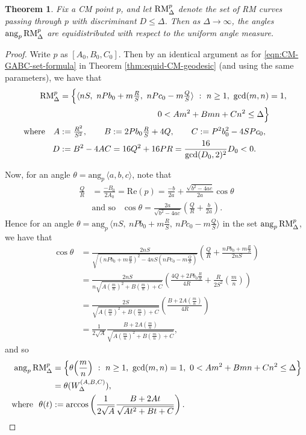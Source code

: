 \documentclass[11pt,letterpaper,reqno]{amsart}
\newtheorem{theorem}{Theorem}[section]
\numberwithin{equation}{section}
\numberwithin{figure}{section}
\numberwithin{table}{section}
\newcommand{\lrp}[1]{\left(#1\right)}
\newcommand{\RM}{\textnormal{RM}}
\begin{document}
{
\renewcommand{\thetheorem}{\ref{thm:equid-RM-fixedpt}}
\begin{theorem} 
    Fix a CM point $p$, and let 
    $\RM^p_{\Delta}$ denote the set of RM curves passing through $p$ with discriminant $D \le \Delta$. 
    Then as $\Delta \to \infty$, the angles $\mathrm{ang}_p\, \RM^p_{\Delta}$ are equidistributed with respect to the uniform angle measure.
\end{theorem}
\addtocounter{theorem}{-1}
}
\begin{proof}  
Write $p$ as $[A_0,B_0,C_0]$. Then by an identical argument as for \eqref{eqn:CM-GABC-set-formula} in Theorem \ref{thm:equid-CM-geodesic} (and using the same parameters), we have that
\begin{align}
    \RM^{p}_{\Delta} 
    &= \Big\{\langle{nS,~nPb_0+m\tfrac{R}{S},~nPc_0-m\tfrac{Q}{S}}\rangle  ~:~ n\ge 1,~ \gcd(m,n)=1,~ \\
    &\hspace{41mm} 0 < A m^2 + B mn + C n^2  \le \Delta
    \Big\} \\
    \text{where}\quad  A&:=\tfrac{R^2}{S^2}, \qquad B := 2Pb_0 \tfrac{R}{S}+4Q, \qquad C := P^2b_0^2-4SPc_0,  \\
     D &:= B^2-4AC = 16Q^2+16PR = \frac{16}{\gcd(D_0,2)^2} D_0 < 0.
\end{align}

Now, for an angle $\theta = \mathrm{ang}_p\, \langle a,b,c \rangle$, note that
\begin{align}
    \frac{Q}{R} &= \frac{-B_0}{2A_0} = \mathrm{Re}(p) = \frac{-b}{2a} + \frac{\sqrt{b^2-4ac}}{2a} \cos \theta \\
    &\text{and so }\ \ \cos \theta = \frac{2a}{\sqrt{b^2-4ac}}\lrp{\frac{Q}{R} + \frac{b}{2a}}.
\end{align}
Hence for an angle $\theta=\mathrm{ang}_p\, \langle{nS,~nPb_0+m\frac{R}{S},~nPc_0-m\frac{Q}{S}}\rangle$ in the set $\mathrm{ang}_p\, \RM^{p}_{\Delta}$, we have that
\begin{align}
    \cos \theta 
    &= \frac{2nS}{\sqrt{(nPb_0+m\frac{R}{S})^2-4nS(nPc_0-m\frac{Q}{S})}}\lrp{\frac{Q}{R} + \frac{nPb_0+m\frac{R}{S}}{2nS}} \\
    &= \frac{2nS}{n\sqrt{A \lrp{\frac mn}^2 + B \lrp{\frac mn} + C}}\lrp{\frac{4Q+2Pb_0 \frac RS}{4R} + \frac{R}{2S^2} \lrp{\frac mn}} \\
    &= \frac{2S}{\sqrt{A \lrp{\frac mn}^2 + B \lrp{\frac mn} + C}}\lrp{\frac{B+2A\lrp{\frac mn}}{4R}} \\
    &= \frac{1}{2\sqrt A}\frac{B+2A\lrp{\frac mn}}{\sqrt{A \lrp{\frac mn}^2 + B \lrp{\frac mn} + C}},
\end{align}
and so
\begin{align}
    \mathrm{ang}_p\, \RM^{p}_{\Delta} 
    &= \Big\{\theta\!\lrp{\frac{m}{n}} ~:~ n\ge 1,~ \gcd(m,n)=1,~   0  < A m^2 + B mn + C n^2  \le \Delta
    \Big\} \\
    &= \theta(W_{\Delta}^{(A,B,C)}), \\
    \text{where }\ \theta(t) &:= \arccos\lrp{\frac{1}{2\sqrt A}\frac{B+2At}{\sqrt{A t^2 + Bt + C}}}.
\end{align}




\end{proof}
\end{document}
